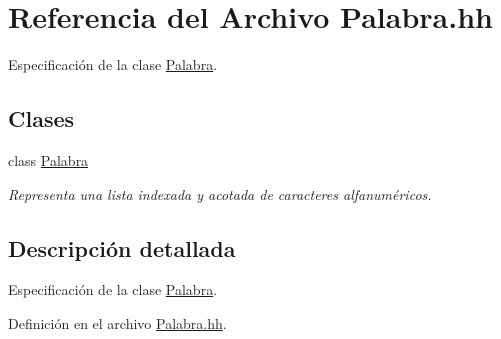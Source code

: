 \hypertarget{_palabra_8hh}{\section{Referencia del Archivo Palabra.\-hh}
\label{_palabra_8hh}
}


Especificación de la clase \hyperlink{class_palabra}{Palabra}.  


\subsection*{Clases}
\begin{DoxyCompactItemize}
\item 
class \hyperlink{class_palabra}{Palabra}
\begin{DoxyCompactList}\small\item\em Representa una lista indexada y acotada de caracteres alfanuméricos. \end{DoxyCompactList}\end{DoxyCompactItemize}


\subsection{Descripción detallada}
Especificación de la clase \hyperlink{class_palabra}{Palabra}. 

Definición en el archivo \hyperlink{_palabra_8hh_source}{Palabra.\-hh}.

